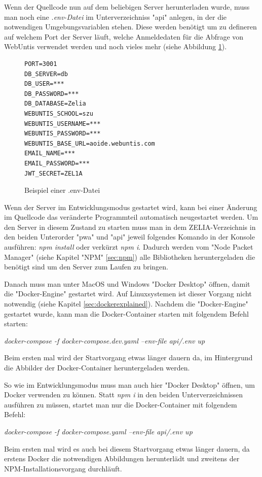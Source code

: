 
Wenn der Quellcode nun auf dem beliebigen Server herunterladen wurde, muss man noch eine \emph{.env-Datei} im Unterverzeichniss "api" anlegen, in der die notwendigen Umgebungsvariablen stehen. Diese werden benötigt um zu defineren auf welchem Port der Server läuft, welche Anmeldedaten für die Abfrage von WebUntis verwendet werden und noch vieles mehr (siehe Abbildung \ref{fig:envexample}).

\begin{figure}[H]
    \begin{lstlisting}
PORT=3001
DB_SERVER=db
DB_USER=***
DB_PASSWORD=***
DB_DATABASE=Zelia
WEBUNTIS_SCHOOL=szu
WEBUNTIS_USERNAME=***
WEBUNTIS_PASSWORD=***
WEBUNTIS_BASE_URL=aoide.webuntis.com
EMAIL_NAME=***
EMAIL_PASSWORD=***
JWT_SECRET=ZEL1A
    \end{lstlisting}
    \caption{Beispiel einer .env-Datei}
   \label{fig:envexample}
\end{figure}


Wenn der Server im Entwicklungsmodus gestartet wird, kann bei einer Änderung im Quellcode das veränderte Programmteil automatisch neugestartet werden. Um den Server in diesem Zustand zu starten muss man in dem ZELIA-Verzeichnis in den beiden Unterorder "pwa" und "api" jeweil folgendes Komando in der Konsole ausführen: \emph{npm install} oder verkürzt \emph{npm i}. Dadurch werden vom "Node Packet Manager" (siehe Kapitel "NPM" \ref{sec:npm}) alle Bibliotheken heruntergeladen die benötigt sind um den Server zum Laufen zu bringen.

Danach muss man unter MacOS und Windows "Docker Desktop" öffnen, damit die "Docker-Engine" gestartet wird. Auf Linuxsystemen ist dieser Vorgang nicht notwendig (siehe Kapitel \ref{sec:dockerexplained}). Nachdem die "Docker-Engine" gestartet wurde, kann man die Docker-Container starten mit folgendem Befehl starten:

\emph{docker-compose -f docker-compose.dev.yaml --env-file api/.env up}  

Beim ersten mal wird der Startvorgang etwas länger dauern da, im Hintergrund die Abbilder der Docker-Container heruntergeladen werden.


So wie im Entwicklungsmodus muss man auch hier "Docker Desktop" öffnen, um Docker verwenden zu können. Statt \emph{npm i} in den beiden Unterverzeichnissen ausführen zu müssen, startet man nur die Docker-Container mit folgendem Befehl:

\emph{docker-compose -f docker-compose.yaml --env-file api/.env up}

Beim ersten mal wird es auch bei diesem Startvorgang etwas länger dauern, da erstens Docker die notwendigen Abbildungen herunterlädt und zweitens der NPM-Installationsvorgang durchläuft.